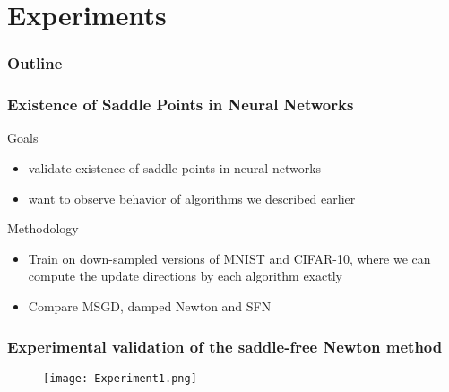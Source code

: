 \documentclass{beamer}
\begin{document}

\section{Experiments}
\begin{frame}
\frametitle{Outline}
\tableofcontents[currentsection]
\end{frame}

\begin{frame}
\frametitle{Existence of Saddle Points in Neural Networks}
\pause
\begin{block}{Goals}

\begin{itemize}
\pause
\item{validate existence of saddle points in neural networks}
\pause
\item{want to observe behavior of algorithms we described earlier}
\end{itemize}
\pause
\end{block}

\begin{block}{Methodology}
\begin{itemize}
\pause
\item{Train on down-sampled versions of MNIST and CIFAR-10, where we can compute the update directions by each algorithm exactly}
\pause
\item{Compare MSGD, damped Newton and SFN}
\end{itemize}

\end{block}

\end{frame}


\begin{frame}
\frametitle{Experimental validation of the saddle-free Newton method}
\begin{figure}
\center
\texttt{[image: Experiment1.png]}
\end{figure}
\end{frame}
\end{document}
